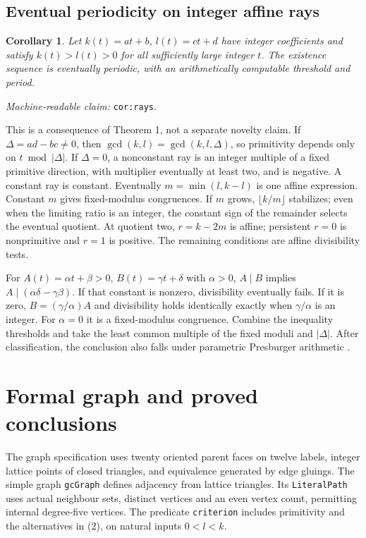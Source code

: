 \documentclass[11pt]{amsart}
\newcommand{\record}[1]{\nolinkurl{#1}}
\newtheorem{corollary}[theorem]{Corollary}
\newcommand{\claimid}[1]{\par\nopagebreak\noindent\textit{Machine-readable claim:} \record{#1}.\par}
\begin{document}
\subsection{Eventual periodicity on integer affine rays}
\begin{corollary}\label{cor:rays}
Let $k(t)=at+b$, $l(t)=ct+d$ have integer coefficients and satisfy
$k(t)>l(t)>0$ for all sufficiently large integer $t$. The existence
sequence is eventually periodic, with an arithmetically computable
threshold and period.
\end{corollary}
\claimid{cor:rays}
This is a consequence of Theorem 1, not a separate novelty claim.
If $\Delta=ad-bc\ne0$, then
$\gcd(k,l)=\gcd(k,l,\Delta)$, so primitivity depends only on
$t\bmod|\Delta|$. If $\Delta=0$, a nonconstant ray is an integer
multiple of a fixed primitive direction, with multiplier eventually
at least two, and is negative. A constant ray is constant.
Eventually $m=\min(l,k-l)$ is one affine expression. Constant $m$
gives fixed-modulus congruences. If $m$ grows, $\lfloor k/m\rfloor$
stabilizes; even when the limiting ratio is an integer, the constant
sign of the remainder selects the eventual quotient. At quotient two,
$r=k-2m$ is affine; persistent $r=0$ is nonprimitive and $r=1$ is
positive. The remaining conditions are affine divisibility tests.

For $A(t)=\alpha t+\beta>0$, $B(t)=\gamma t+\delta$ with
$\alpha>0$, $A\mid B$ implies $A\mid(\alpha\delta-\gamma\beta)$.
If that constant is nonzero, divisibility eventually fails. If it is
zero, $B=(\gamma/\alpha)A$ and divisibility holds identically exactly
when $\gamma/\alpha$ is an integer. For $\alpha=0$ it is a
fixed-modulus congruence. Combine the inequality thresholds and take
the least common multiple of the fixed moduli and $|\Delta|$.
After
classification, the conclusion also falls under parametric Presburger
arithmetic \cite{BGW}.

\section{Formal graph and proved conclusions}\label{sec:lean}
The graph specification uses twenty oriented parent faces on twelve
labels, integer lattice points of closed triangles, and equivalence
generated by edge gluings. The simple graph \record{gcGraph} defines
adjacency from lattice triangles. Its \record{LiteralPath} uses actual
neighbour sets, distinct vertices and an even vertex count, permitting
internal degree-five vertices. The predicate \record{criterion}
includes primitivity and the alternatives in (2), on natural inputs
$0<l<k$.
\end{document}
